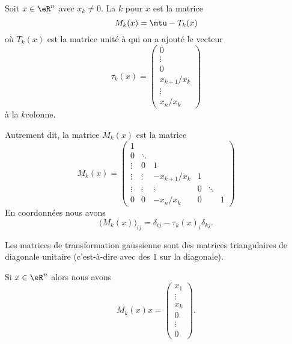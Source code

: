 \begin{definition}
	Soit \( x\in \eR^n\) avec \( x_k\neq 0\). La \( k\)\ieme {} pour \( x\) est la matrice
	\begin{equation}
		M_k(x)=\mtu-T_k(x)
	\end{equation}
	où \( T_k(x)\) est la matrice unité à qui on a ajouté le vecteur
	\begin{equation}
		\tau_k(x)=
		\begin{pmatrix}
			0           \\
			\vdots      \\
			0           \\
			x_{k+1}/x_k \\
			\vdots      \\
			x_n/x_k
		\end{pmatrix}
	\end{equation}
	à la \( k\)\ieme colonne.
\end{definition}
Autrement dit, la matrice \( M_k(x)\) est la matrice
\begin{equation}        \label{EQooMWXLooBDtsKS}
	M_k(x)=\begin{pmatrix}
		1      &        &              &   &        &   \\
		0      & \ddots &              &   &        &   \\
		\vdots & 0      & 1            &   &        &   \\
		\vdots & \vdots & -x_{k+1}/x_k & 1 &        &   \\
		\vdots & \vdots & \vdots       & 0 & \ddots &   \\
		0      & 0      & -x_n/x_k     & 0 &        & 1
	\end{pmatrix}
\end{equation}
En coordonnées nous avons
\begin{equation}
	\big( M_k(x)\big)_{ij}=\delta_{ij}-\tau_k(x)_i\delta_{kj}.
\end{equation}

\begin{normaltext}
	Les matrices de transformation gaussienne sont des matrices triangulaires de diagonale unitaire (c'est-à-dire avec des \( 1\) sur la diagonale).
\end{normaltext}

\begin{lemma}
	Si \( x\in \eR^n\) alors nous avons
	\begin{equation}
		M_k(x)x=\begin{pmatrix}
			x_1    \\
			\vdots \\
			x_k    \\
			0      \\
			\vdots \\
			0
		\end{pmatrix}.
	\end{equation}
\end{lemma}

